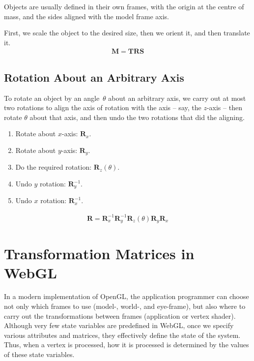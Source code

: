 \documentclass[../COS3712_Notes.tex]{subfiles}
\begin{document}
        Objects are usually defined in their own frames, with the origin at the centre of mass,
        and the sides aligned with the model frame axis.

        First, we scale the object to the desired size, then we orient it, and then translate it.
        \begin{align*}
          \mathbf{M} = \mathbf{TRS}
        \end{align*}

      \subsection{Rotation About an Arbitrary Axis}
        To rotate an object by an angle~$\theta$ about an arbitrary axis, we carry out at most
        two rotations to align the axis of rotation with the axis -- say, the $z$-axis --
        then rotate $\theta$ about that axis, and then undo the two rotations that
        did the aligning.

        \begin{enumerate}[nosep]
          \item Rotate about $x$-axis: $\mathbf{R}_x$.
          \item Rotate about $y$-axis: $\mathbf{R}_y$.
          \item Do the required rotation: $\mathbf{R}_z(\theta)$.
          \item Undo $y$ rotation: $\mathbf{R}^{-1}_y$.
          \item Undo $x$ rotation: $\mathbf{R}^{-1}_x$.
        \end{enumerate}
        \begin{align*}
          \mathbf{R} = \mathbf{R}^{-1}_x \mathbf{R}^{-1}_y \mathbf{R}_z(\theta) \mathbf{R}_y \mathbf{R}_x
        \end{align*}

    \section{Transformation Matrices in WebGL}
      In a modern implementation of OpenGL, the application programmer can choose not only
      which frames to use
      (model-, world-, and eye-frame),
      but also where to carry out the transformations between frames
      (application or vertex shader).
      Although very few state variables are predefined in WebGL, once we specify various
      attributes and matrices, they effectively define the state of the system.
      Thus, when a vertex is processed, how it is processed is determined by the values
      of these state variables.
\end{document}

